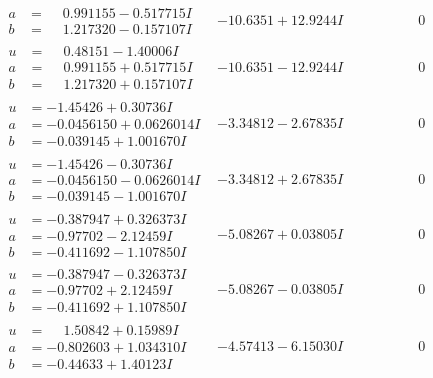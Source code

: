 \documentclass[1p]{elsarticle_modified}
\theoremstyle{definition}
\begin{document}
$$\begin{array}{c|c|c}
\begin{aligned}
a &= \phantom{-}0.991155 - 0.517715 I \\
b &= \phantom{-}1.217320 - 0.157107 I\end{aligned}
 & -10.6351 + 12.9244 I & \phantom{-0.000000 } 0 \\ \hline\begin{aligned}
u &= \phantom{-}0.48151 - 1.40006 I \\
a &= \phantom{-}0.991155 + 0.517715 I \\
b &= \phantom{-}1.217320 + 0.157107 I\end{aligned}
 & -10.6351 - 12.9244 I & \phantom{-0.000000 } 0 \\ \hline\begin{aligned}
u &= -1.45426 + 0.30736 I \\
a &= -0.0456150 + 0.0626014 I \\
b &= -0.039145 + 1.001670 I\end{aligned}
 & -3.34812 - 2.67835 I & \phantom{-0.000000 } 0 \\ \hline\begin{aligned}
u &= -1.45426 - 0.30736 I \\
a &= -0.0456150 - 0.0626014 I \\
b &= -0.039145 - 1.001670 I\end{aligned}
 & -3.34812 + 2.67835 I & \phantom{-0.000000 } 0 \\ \hline\begin{aligned}
u &= -0.387947 + 0.326373 I \\
a &= -0.97702 - 2.12459 I \\
b &= -0.411692 - 1.107850 I\end{aligned}
 & -5.08267 + 0.03805 I & \phantom{-0.000000 } 0 \\ \hline\begin{aligned}
u &= -0.387947 - 0.326373 I \\
a &= -0.97702 + 2.12459 I \\
b &= -0.411692 + 1.107850 I\end{aligned}
 & -5.08267 - 0.03805 I & \phantom{-0.000000 } 0 \\ \hline\begin{aligned}
u &= \phantom{-}1.50842 + 0.15989 I \\
a &= -0.802603 + 1.034310 I \\
b &= -0.44633 + 1.40123 I\end{aligned}
 & -4.57413 - 6.15030 I & \phantom{-0.000000 } 0 \\ \hline\begin{aligned}

\end{aligned}
\end{array}$$
\end{document}
